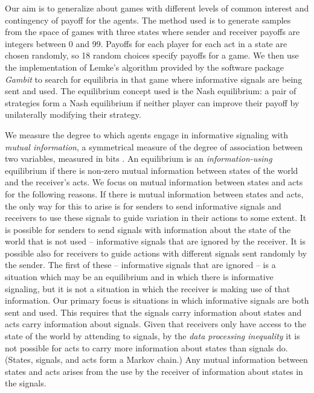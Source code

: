 \documentclass[10pt]{article}
\begin{document}
Our aim is to generalize about games with different levels of common
interest and contingency of payoff for the agents. The method used is to
generate samples from the space of games with three states where sender
and receiver payoffs are integers between 0 and 99. Payoffs for each
player for each act in a state are chosen randomly, so 18 random choices
specify payoffs for a game. We then use the implementation of Lemke's
\cite{Lemke1965} algorithm provided by the software package \emph{Gambit} \cite{McKelvey2010} to
search for equilibria in that game where informative signals are being
sent and used. The equilibrium concept used is the Nash equilibrium: a
pair of strategies form a Nash equilibrium if neither player can improve
their payoff by unilaterally modifying their strategy.

We measure the degree to which agents engage in informative signaling
with \emph{mutual information}, a symmetrical measure of the degree of
association between two variables, measured in bits \cite[p.~7]{Cover2006}. An equilibrium is an
\emph{information-using} equilibrium if there is non-zero mutual
information between states of the world and the receiver's acts. We
focus on mutual information between states and acts for the following
reasons. If there is mutual information between states and acts, the
only way for this to arise is for senders to send informative signals
and receivers to use these signals to guide variation in their actions
to some extent. It is possible for senders to send signals with
information about the state of the world that is not used -- informative
signals that are ignored by the receiver. It is possible also for
receivers to guide actions with different signals sent randomly by the
sender. The first of these -- informative signals that are ignored -- is
a situation which may be an equilibrium and in which there is
informative signaling, but it is not a situation in which the receiver
is making use of that information. Our primary focus is situations in
which informative signals are both sent and used. This requires that the
signals carry information about states and acts carry information about
signals. Given that receivers only have access to the state of the world
by attending to signals, by the \emph{data processing inequality} \cite[p.~34]{Cover2006}
it is not possible for acts to carry more information about states than
signals do. (States, signals, and acts form a Markov chain.) Any mutual
information between states and acts arises from the use by the receiver
of information about states in the signals.
\end{document}
